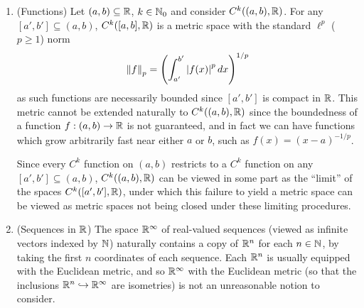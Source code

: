 \documentclass[11pt]{article}
\begin{document}
\begin{example}\label{nonmetric}
    \begin{enumerate}
        \item (Functions) Let $(a, b) \subseteq \mathbb{R}$, $k \in \mathbb{N}_0$ and consider $C^k((a, b), \mathbb{R})$. For any $[a', b'] \subseteq (a, b)$, $C^k([a, b], \mathbb{R})$ is a metric space with the standard $\ell^p$ ($p \geq 1$) norm
        $$
            \left\| f \right\|_p = \left(  \int_{a'}^{b'}\left| f(x) \right|^p dx  \right)^{1/p}
        $$
        as such functions are necessarily bounded since $[a', b']$ is compact in $\mathbb{R}$. This metric cannot be extended naturally to $C^k((a, b), \mathbb{R})$ since the boundedness of a function $f : (a, b) \to \mathbb{R}$ is not guaranteed, and in fact we can have functions which grow arbitrarily fast near either $a$ or $b$, such as $f(x) = (x - a)^{-1/p}$. 
        
        Since every $C^k$ function on $(a, b)$ restricts to a $C^k$ function on any $[a', b'] \subseteq (a, b)$, $C^k((a, b), \mathbb{R})$ can be viewed in some part as the ``limit'' of the spaces $C^k([a', b'], \mathbb{R})$, under which this failure to yield a metric space can be viewed as metric spaces not being closed under these limiting procedures.
        \item (Sequences in $\mathbb{R}$) The space $\mathbb{R}^\infty$ of real-valued sequences (viewed as infinite vectors indexed by $\mathbb{N}$) naturally contains a copy of $\mathbb{R}^n$ for each $n \in \mathbb{N}$, by taking the first $n$ coordinates of each sequence. Each $\mathbb{R}^n$ is usually equipped with the Euclidean metric, and so $\mathbb{R}^\infty$ with the Euclidean metric (so that the inclusions $\mathbb{R}^n \hookrightarrow \mathbb{R}^\infty$ are isometries) is not an unreasonable notion to consider. 
        

\end{enumerate}
\end{example}
\end{document}
